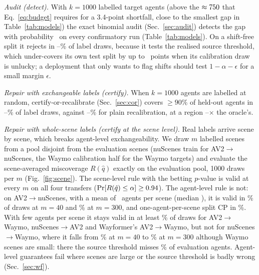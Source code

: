 \emph{Audit (detect).} With $k=1000$ labelled target agents (above the $\approx750$ that Eq.~\eqref{eq:budget} requires for a 3.4-point shortfall,
close to the smallest gap in Table~\ref{tab:models}) the exact binomial audit (Sec.~\ref{sec:audit}) detects the gap with probability \auditPowerConfMin\ on every confirmatory run (Table~\ref{tab:models}). On a shift-free split it rejects in
\auditFaAllMin--\auditFaAllMax\% of label draws, because it tests the realised source threshold, which under-covers its own
test split by up to \auditSameGapMax\ points when its calibration draw is unlucky; a deployment that only wants to flag shifts
should test $1-\alpha-\epsilon$ for a small margin $\epsilon$.

\emph{Repair with exchangeable labels (certify).} When $k=1000$ agents are labelled at random, certify-or-recalibrate
(Sec.~\ref{sec:cor}) covers $\ge90\%$ of held-out agents in \corCORMin--\corCORMax\% of label draws, against
\corDirectMin--\corDirectMax\% for plain recalibration, at a region \corCORareaMin--\corCORareaMax$\times$ the oracle's.

\emph{Repair with whole-scene labels (certify at the scene level).} Real labels arrive scene by scene, which breaks agent-level exchangeability. We
draw $m$ labelled scenes from a pool disjoint from the evaluation scenes (nuScenes train for AV2$\to$nuScenes, the
Waymo calibration half for the Waymo targets) and evaluate the scene-averaged miscoverage $R(\hat q)$ exactly on the
evaluation pool, 1000 draws per $m$ (Fig.~\ref{fig:scene}). The scene-level rule with the betting $p$-value is valid at
every $m$ on all four transfers ($\Pr[R(\hat q)\le\alpha]\ge0.94$). The agent-level rule is not: on
AV2$\to$nuScenes, with a mean of \nsAgentsMean\ agents per scene (median \nsAgentsMedian), it is valid in \agentCorNsForty\% of draws at $m=40$ and
\agentCorNsThreeHundred\% at $m=300$, and one-agent-per-scene split CP \cite{dunn2023hierarchical} in
\hierNsThreeHundred\%. With few agents per scene it stays valid in at least \agentCorSmallMin\% of draws for AV2$\to$Waymo,
nuScenes$\to$AV2 and Wayformer's AV2$\to$Waymo, but not for nuScenes$\to$Waymo, where it falls from
\agentCorNsWmForty\% at $m=40$ to \agentCorNsWmThreeHundred\% at $m=300$ although Waymo scenes are small: there the
source threshold misses \rSrcNsWm\% of evaluation agents. Agent-level guarantees fail where scenes are large or the
source threshold is badly wrong (Sec.~\ref{sec:wf}).

